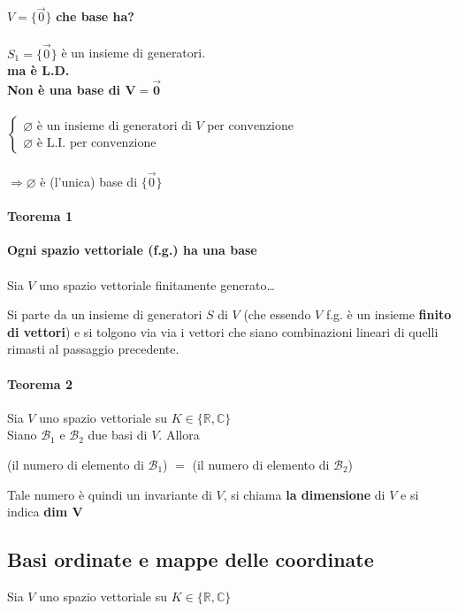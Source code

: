 $V=\{\vec{0}\}$ \textbf{che base ha?}\\\\
$S_1=\{\vec{0}\}$ è un insieme di generatori. \\
\textbf{ma è L.D.}\\
\textbf{Non è una base di $\pmb{V=\vec{0}}$}\\\\
$ 
\begin{cases}
    \varnothing \textrm{ è un insieme di generatori di }V\textrm{ per convenzione}\\
    \varnothing \textrm{ è L.I. per convenzione}
\end{cases}
$\\\\
$\Longrightarrow \varnothing$ è (l'unica) base di $\{\vec{0}\}$

\paragraph{Teorema 1} \textbf{Ogni spazio vettoriale (f.g.) ha una base}\\\\
Sia $V$  uno spazio vettoriale finitamente generato\dots

Si parte da un insieme di generatori $S$ di $V$ (che essendo $V$ f.g. è un insieme \textbf{finito di vettori})
e si tolgono via via i vettori che siano combinazioni lineari di quelli rimasti al passaggio precedente.

\paragraph{Teorema 2} Sia $V$ uno spazio vettoriale su $K\in\{\mathbb{R}, \mathbb{C}\}$\\
Siano $\mathcal{B}_1$ e $\mathcal{B}_2$ due basi di $V$. Allora 

\begin{center}
    (il numero di elemento di $\mathcal{B}_1$) $=$ 
    (il numero di elemento di $\mathcal{B}_2$) 
\end{center}

Tale numero è quindi un invariante di $V$, si chiama \textbf{la dimensione} di $V$ e si indica \textbf{dim $\pmb{V}$}




\subsection{Basi ordinate e mappe delle coordinate}
Sia $V$ uno spazio vettoriale su $K\in\{\mathbb{R}, \mathbb{C}\}$
